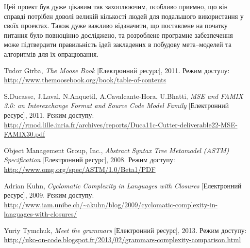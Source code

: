 \documentclass[12pt,a4paper]{article}
\begin{document}
Цей проект був дуже цікавим так захоплюючим, особливо приємно, що він справді потрібен доволі великій кількості людей для подальшого використання у своїх проектах. Також дуже важливо відзначити, що поставлене на початку питання було повноцінно досліджено, та розроблене програмне забезпечення може підтвердити правильність ідей закладених в побудову мета--моделей та алгоритмів для їх опрацювання.

\clearpage

\begin{thebibliography}{9}

Tudor Girba, \emph{The Moose Book} [Електронний ресурс],
    2011. Режим доступу:
    \url{http://www.themoosebook.org/book/table-of-contents}

S.Ducasse, J.Laval, N.Anquetil, A.Cavalcante-Hora, U.Bhatti, \emph{MSE and FAMIX 3.0: an Interexchange Format and Source Code Model Family} [Електронний ресурс], 2011. Режим доступу:
    \url{http://rmod.lille.inria.fr/archives/reports/Duca11c-Cutter-deliverable22-MSE-FAMIX30.pdf}
    
Object Management Group, Inc., \emph{Abstract Syntax Tree Metamodel (ASTM) Specification} [Електронний ресурс], 2008. Режим доступу:
    \url{http://www.omg.org/spec/ASTM/1.0/Beta1/PDF}

Adrian Kuhn, \emph{Cyclomatic Complexity in Languages with Closures} [Електронний ресурс], 2009. Режим доступу:
    \url{http://www.iam.unibe.ch/~akuhn/blog/2009/cyclomatic-complexity-in-languages-with-closures/}

Yuriy Tymchuk, \emph{Meet the grammars} [Електронний ресурс], 2013. Режим доступу:
    \url{http://uko-on-code.blogspot.fr/2013/02/grammars-complexity-comparison.html}

\end{thebibliography}
\end{document}
